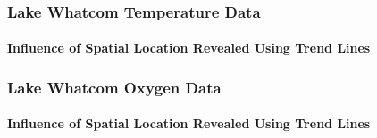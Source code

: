 \documentclass[10pt]{beamer}
\begin{document}
\begin{frame}
\frametitle{Lake Whatcom Temperature Data}
\framesubtitle{Influence of Spatial Location Revealed Using Trend Lines}
\begin{center}
\end{center}
\end{frame}


\begin{frame}
\frametitle{Lake Whatcom Oxygen Data}
\framesubtitle{Influence of Spatial Location Revealed Using Trend Lines}
\begin{center}
\end{center}
\end{frame}
\end{document}
